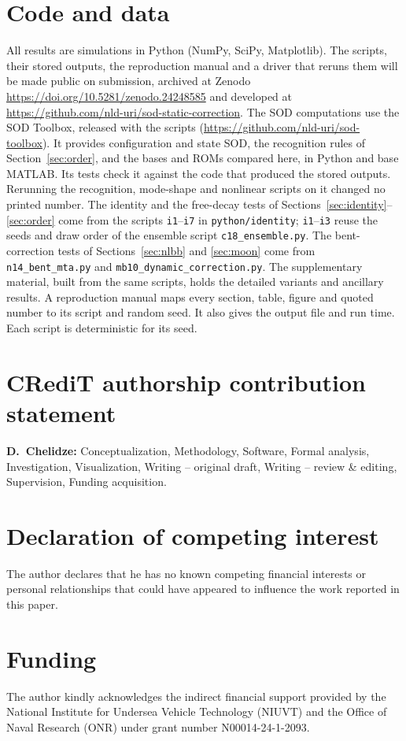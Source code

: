 \documentclass[preprint,12pt]{elsarticle}
\begin{document}
\section{Code and data}\label{app:repro}
All results are simulations in Python (NumPy, SciPy, Matplotlib). The scripts, their stored outputs, the reproduction manual and a driver that reruns them will be made public on submission, archived at Zenodo \url{https://doi.org/10.5281/zenodo.24248585} and developed at \url{https://github.com/nld-uri/sod-static-correction}.
The SOD computations use the SOD Toolbox, released with the scripts (\url{https://github.com/nld-uri/sod-toolbox}).
It provides configuration and state SOD, the recognition rules of Section~\ref{sec:order}, and the bases and ROMs compared here, in Python and base MATLAB.
Its tests check it against the code that produced the stored outputs. Rerunning the recognition, mode-shape and nonlinear scripts on it changed no printed number.
The identity and the free-decay tests of Sections~\ref{sec:identity}--\ref{sec:order} come from the scripts \texttt{i1}--\texttt{i7} in \texttt{python/identity}; \texttt{i1}--\texttt{i3} reuse the seeds and draw order of the ensemble script \texttt{c18\_ensemble.py}.
The bent-correction tests of Sections~\ref{sec:nlbb} and \ref{sec:moon} come from \texttt{n14\_bent\_mta.py} and \texttt{mb10\_dynamic\_correction.py}. The supplementary material, built from the same scripts, holds the detailed variants and ancillary results.
A reproduction manual maps every section, table, figure and quoted number to its script and random seed. It also gives the output file and run time. Each script is deterministic for its seed.

\section*{CRediT authorship contribution statement}
\textbf{D.~Chelidze:} Conceptualization, Methodology, Software, Formal analysis, Investigation, Visualization, Writing -- original draft, Writing -- review \& editing, Supervision, Funding acquisition.

\section*{Declaration of competing interest}
The author declares that he has no known competing financial interests or personal relationships that could have appeared to influence the work reported in this paper.

\section*{Funding}
The author kindly acknowledges the indirect financial support provided by the National Institute for Undersea Vehicle Technology (NIUVT) and the Office of Naval Research (ONR) under grant number N00014-24-1-2093.
\end{document}
